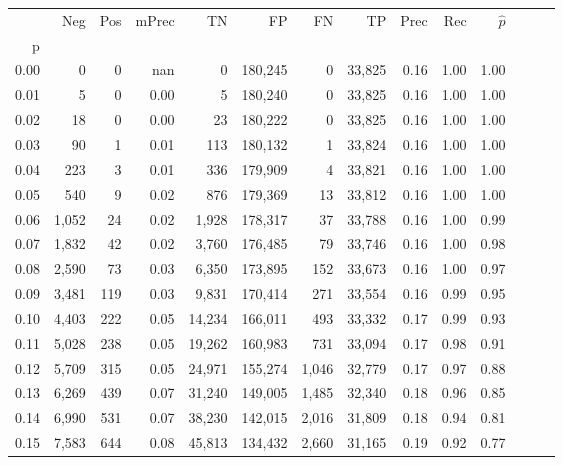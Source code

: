 \begin{tabular}{rrrrrrrrrrrrrr}
\toprule
{} &    Neg &    Pos & mPrec &       TN &       FP &      FN &      TP &  Prec &   Rec & $\hat{p}$ \\
p    &        &        &       &          &          &         &         &       &       &           \\
\midrule
0.00 &      0 &      0 &   nan &        0 &  180,245 &       0 &  33,825 &  0.16 &  1.00 &      1.00 \\
0.01 &      5 &      0 &  0.00 &        5 &  180,240 &       0 &  33,825 &  0.16 &  1.00 &      1.00 \\
0.02 &     18 &      0 &  0.00 &       23 &  180,222 &       0 &  33,825 &  0.16 &  1.00 &      1.00 \\
0.03 &     90 &      1 &  0.01 &      113 &  180,132 &       1 &  33,824 &  0.16 &  1.00 &      1.00 \\
0.04 &    223 &      3 &  0.01 &      336 &  179,909 &       4 &  33,821 &  0.16 &  1.00 &      1.00 \\
0.05 &    540 &      9 &  0.02 &      876 &  179,369 &      13 &  33,812 &  0.16 &  1.00 &      1.00 \\
0.06 &  1,052 &     24 &  0.02 &    1,928 &  178,317 &      37 &  33,788 &  0.16 &  1.00 &      0.99 \\
0.07 &  1,832 &     42 &  0.02 &    3,760 &  176,485 &      79 &  33,746 &  0.16 &  1.00 &      0.98 \\
0.08 &  2,590 &     73 &  0.03 &    6,350 &  173,895 &     152 &  33,673 &  0.16 &  1.00 &      0.97 \\
0.09 &  3,481 &    119 &  0.03 &    9,831 &  170,414 &     271 &  33,554 &  0.16 &  0.99 &      0.95 \\
0.10 &  4,403 &    222 &  0.05 &   14,234 &  166,011 &     493 &  33,332 &  0.17 &  0.99 &      0.93 \\
0.11 &  5,028 &    238 &  0.05 &   19,262 &  160,983 &     731 &  33,094 &  0.17 &  0.98 &      0.91 \\
0.12 &  5,709 &    315 &  0.05 &   24,971 &  155,274 &   1,046 &  32,779 &  0.17 &  0.97 &      0.88 \\
0.13 &  6,269 &    439 &  0.07 &   31,240 &  149,005 &   1,485 &  32,340 &  0.18 &  0.96 &      0.85 \\
0.14 &  6,990 &    531 &  0.07 &   38,230 &  142,015 &   2,016 &  31,809 &  0.18 &  0.94 &      0.81 \\
0.15 &  7,583 &    644 &  0.08 &   45,813 &  134,432 &   2,660 &  31,165 &  0.19 &  0.92 &      0.77 \\

\end{tabular}
